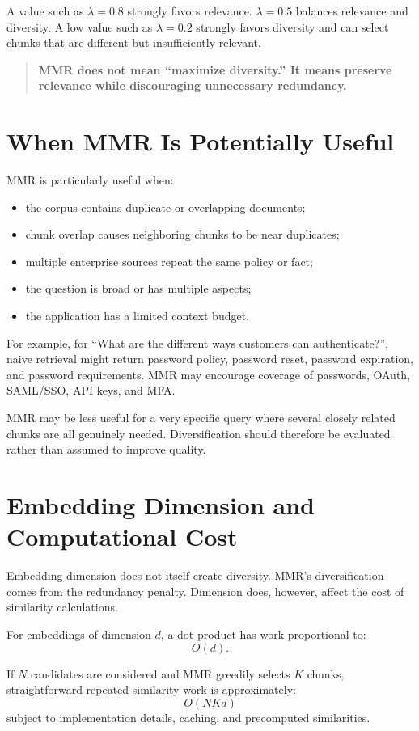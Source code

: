 \documentclass[12pt,a4paper]{article}
\begin{document}
A value such as $\lambda=0.8$ strongly favors relevance. $\lambda=0.5$ balances relevance and diversity. A low value such as $\lambda=0.2$ strongly favors diversity and can select chunks that are different but insufficiently relevant.

\begin{quote}\textbf{MMR does not mean ``maximize diversity.'' It means preserve relevance while discouraging unnecessary redundancy.}\end{quote}

\section{When MMR Is Potentially Useful}
MMR is particularly useful when:
\begin{itemize}
\item the corpus contains duplicate or overlapping documents;
\item chunk overlap causes neighboring chunks to be near duplicates;
\item multiple enterprise sources repeat the same policy or fact;
\item the question is broad or has multiple aspects;
\item the application has a limited context budget.
\end{itemize}

For example, for ``What are the different ways customers can authenticate?'', naive retrieval might return password policy, password reset, password expiration, and password requirements. MMR may encourage coverage of passwords, OAuth, SAML/SSO, API keys, and MFA.

MMR may be less useful for a very specific query where several closely related chunks are all genuinely needed. Diversification should therefore be evaluated rather than assumed to improve quality.

\section{Embedding Dimension and Computational Cost}
Embedding dimension does not itself create diversity. MMR's diversification comes from the redundancy penalty. Dimension does, however, affect the cost of similarity calculations.

For embeddings of dimension $d$, a dot product has work proportional to:
\[
O(d).
\]

If $N$ candidates are considered and MMR greedily selects $K$ chunks, straightforward repeated similarity work is approximately:
\[
\boxed{O(NKd)}
\]
subject to implementation details, caching, and precomputed similarities.
\end{document}
